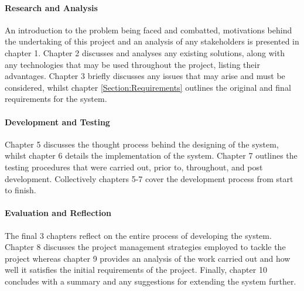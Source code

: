 \paragraph{Research and Analysis}
An introduction to the problem being faced and combatted, motivations behind the undertaking of this project and an analysis of any stakeholders is presented in chapter 1. Chapter 2 discusses and analyses any existing solutions, along with any technologies that may be used throughout the project, listing their advantages. Chapter 3 briefly discusses any issues that may arise and must be considered, whilst chapter \ref{Section:Requirements} outlines the original and final requirements for the system.

\paragraph{Development and Testing}
Chapter 5 discusses the thought process behind the designing of the system, whilst chapter 6 details the implementation of the system. Chapter 7 outlines the testing procedures that were carried out, prior to, throughout, and post development. Collectively chapters 5-7 cover the development process from start to finish.

\paragraph{Evaluation and Reflection}
The final 3 chapters reflect on the entire process of developing the system. Chapter 8 discusses the project management strategies employed to tackle the project whereas chapter 9 provides an analysis of the work carried out and how well it satisfies the initial requirements of the project. Finally, chapter 10 concludes with a summary and any suggestions for extending the system further.

\newpage